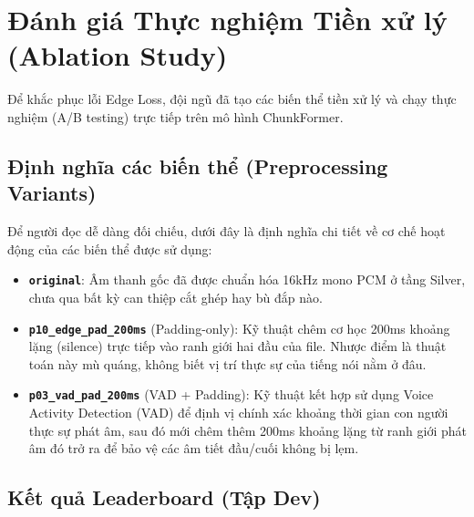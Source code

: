 \documentclass[12pt,a4paper]{article}
\begin{document}
\section{Đánh giá Thực nghiệm Tiền xử lý (Ablation Study)}

Để khắc phục lỗi Edge Loss, đội ngũ đã tạo các biến thể tiền xử lý và chạy thực nghiệm (A/B testing) trực tiếp trên mô hình ChunkFormer.

\subsection{Định nghĩa các biến thể (Preprocessing Variants)}
Để người đọc dễ dàng đối chiếu, dưới đây là định nghĩa chi tiết về cơ chế hoạt động của các biến thể được sử dụng:
\begin{itemize}[leftmargin=1.2cm]
    \item \textbf{\texttt{original}}: Âm thanh gốc đã được chuẩn hóa 16kHz mono PCM ở tầng Silver, chưa qua bất kỳ can thiệp cắt ghép hay bù đắp nào.
    \item \textbf{\texttt{p10\_edge\_pad\_200ms}} (Padding-only): Kỹ thuật chêm cơ học 200ms khoảng lặng (silence) trực tiếp vào ranh giới hai đầu của file. Nhược điểm là thuật toán này mù quáng, không biết vị trí thực sự của tiếng nói nằm ở đâu.
    \item \textbf{\texttt{p03\_vad\_pad\_200ms}} (VAD + Padding): Kỹ thuật kết hợp sử dụng Voice Activity Detection (VAD) để định vị chính xác khoảng thời gian con người thực sự phát âm, sau đó mới chêm thêm 200ms khoảng lặng từ ranh giới phát âm đó trở ra để bảo vệ các âm tiết đầu/cuối không bị lẹm.
\end{itemize}

\subsection{Kết quả Leaderboard (Tập Dev)}

\begin{table}[h]
\centering
\caption{Kết quả chạy ChunkFormer trên các biến thể tiền xử lý}
\end{table}
\end{document}
